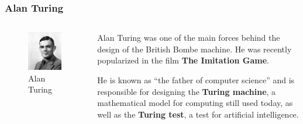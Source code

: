\documentclass{beamer}
\newcommand{\<}{\langle}
\renewcommand{\>}{\rangle}
\begin{document}
\begin{frame}
\frametitle{Alan Turing}

\begin{columns}
\begin{column}{.5\textwidth}
\begin{figure}
\includegraphics[scale=.3]{IMG/turing}
\caption{\scriptsize Alan Turing}
\end{figure}
\end{column}
\begin{column}{.5\textwidth}
Alan Turing was one of the main forces behind the design of the British Bombe machine. He was recently popularized in the film \textbf{The Imitation Game}. \newline

He is known as 	``the father of computer science'' and is responsible for designing the \textbf{Turing machine}, a mathematical model for computing still used today, as well as the \textbf{Turing test}, a test for artificial intelligence.
\end{column}
\end{columns}
\end{frame}
\end{document}
